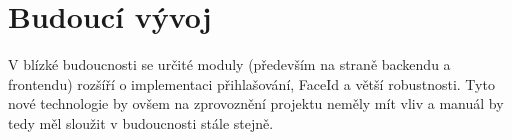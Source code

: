 \documentclass{article}
\begin{document}





\section{Budoucí vývoj}
V blízké budoucnosti se určité moduly (především na straně backendu a frontendu) rozšíří o implementaci přihlašování, FaceId a větší robustnosti. Tyto nové technologie by ovšem na zprovoznění projektu neměly mít vliv a manuál by tedy měl sloužit v budoucnosti stále stejně.
\end{document}
